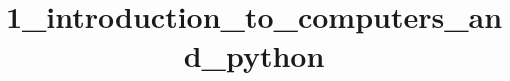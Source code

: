 \newcommand{\ConstantTok}[1]{\textcolor[rgb]{0.53,0.00,0.00}{{#1}}}
\newcommand{\SpecialCharTok}[1]{\textcolor[rgb]{0.25,0.44,0.63}{{#1}}}
\newcommand{\VerbatimStringTok}[1]{\textcolor[rgb]{0.25,0.44,0.63}{{#1}}}
\newcommand{\SpecialStringTok}[1]{\textcolor[rgb]{0.73,0.40,0.53}{{#1}}}
\newcommand{\ImportTok}[1]{{#1}}
\newcommand{\DocumentationTok}[1]{\textcolor[rgb]{0.73,0.13,0.13}{\textit{{#1}}}}
\newcommand{\AnnotationTok}[1]{\textcolor[rgb]{0.38,0.63,0.69}{\textbf{\textit{{#1}}}}}
\newcommand{\CommentVarTok}[1]{\textcolor[rgb]{0.38,0.63,0.69}{\textbf{\textit{{#1}}}}}
\newcommand{\VariableTok}[1]{\textcolor[rgb]{0.10,0.09,0.49}{{#1}}}
\newcommand{\ControlFlowTok}[1]{\textcolor[rgb]{0.00,0.44,0.13}{\textbf{{#1}}}}
\newcommand{\OperatorTok}[1]{\textcolor[rgb]{0.40,0.40,0.40}{{#1}}}
\newcommand{\BuiltInTok}[1]{{#1}}
\newcommand{\ExtensionTok}[1]{{#1}}
\newcommand{\PreprocessorTok}[1]{\textcolor[rgb]{0.74,0.48,0.00}{{#1}}}
\newcommand{\AttributeTok}[1]{\textcolor[rgb]{0.49,0.56,0.16}{{#1}}}
\newcommand{\InformationTok}[1]{\textcolor[rgb]{0.38,0.63,0.69}{\textbf{\textit{{#1}}}}}
\newcommand{\WarningTok}[1]{\textcolor[rgb]{0.38,0.63,0.69}{\textbf{\textit{{#1}}}}}


\def\br{\hspace*{\fill} \\* }
\def\gt{>}
\def\lt{<}
\let\Oldtex\TeX
\let\Oldlatex\LaTeX
\renewcommand{\TeX}{\textrm{\Oldtex}}
\renewcommand{\LaTeX}{\textrm{\Oldlatex}}
\title{1\_introduction\_to\_computers\_and\_python}





\makeatletter
\def\PY@reset{\let\PY@it=\relax \let\PY@bf=\relax%
\let\PY@ul=\relax \let\PY@tc=\relax%
\let\PY@bc=\relax \let\PY@ff=\relax}
\def\PY@tok#1{\csname PY@tok@#1\endcsname}
\def\PY@toks#1+{\ifx\relax#1\empty\else%
\PY@tok{#1}\expandafter\PY@toks\fi}
\def\PY@do#1{\PY@bc{\PY@tc{\PY@ul{%
\PY@it{\PY@bf{\PY@ff{#1}}}}}}}
\def\PY#1#2{\PY@reset\PY@toks#1+\relax+\PY@do{#2}}

